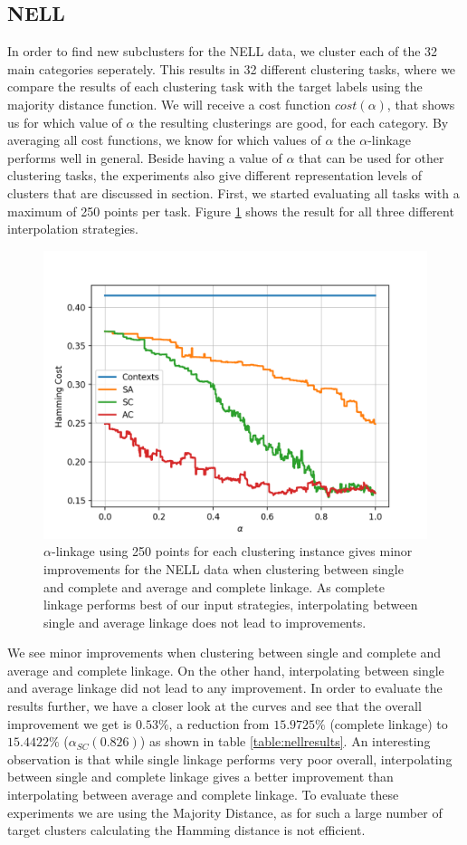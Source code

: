 \subsection{NELL}

In order to find new subclusters for the NELL data, we cluster each of the 32 main categories seperately. This results in 32 different clustering tasks, where we compare the results of each clustering task with the target labels using the majority distance function. We will receive a cost function $cost(\alpha)$, that shows us for which value of $\alpha$ the resulting clusterings are good, for each category. By averaging all cost functions, we know for which values of $\alpha$ the $\alpha$-linkage performs well in general. Beside having a value of $\alpha$ that can be used for other clustering tasks, the experiments also give different representation levels of clusters that are discussed in section. First, we started evaluating all tasks with a maximum of 250 points per task. Figure \ref{fig:nellresults} shows the result for all three different interpolation strategies.

\begin{figure}[h]
\centering
  \includegraphics[width=.5\linewidth]{plots/nell_250}
\caption{$\alpha$-linkage using 250 points for each clustering instance gives minor improvements for the NELL data when clustering between single and complete and average and complete linkage. As complete linkage performs best of our input strategies, interpolating between single and average linkage does not lead to improvements.}
\label{fig:nellresults}
\end{figure}

We see minor improvements when clustering between single and complete and average and complete linkage. On the other hand, interpolating between single and average linkage did not lead to any improvement. In order to evaluate the results further, we have a closer look at the curves and see that the overall improvement we get is $0.53\%$, a reduction from $15.9725\%$ (complete linkage) to $15.4422\%$ ($\alpha_{SC}(0.826)$) as shown in table \ref{table:nellresults}. An interesting observation is that while single linkage performs very poor overall, interpolating between single and complete linkage gives a better improvement than interpolating between average and complete linkage. To evaluate these experiments we are using the Majority Distance, as for such a large number of target clusters calculating the Hamming distance is not efficient. 

